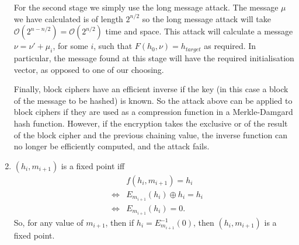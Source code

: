 \begin{enumerate}
For the second stage we simply use the long message attack. The message $\mu$
we have calculated is of length $2^{n/2}$ so the long message attack will take
$\mathcal{O}(2^{n-n/2})=\mathcal{O}(2^{n/2})$ time and space. This attack will
calculate a message $\nu=\nu'+\mu_i$, for some $i$, such that $F(h_0,\nu)=h_{target}$
as required. In particular, the message found at this stage will have the required
initialisation vector, as opposed to one of our choosing.

Finally, block ciphers have an efficient inverse if the key (in this case a block
of the message to be hashed) is known. So the attack above can be applied to block ciphers
if they are used as a compression function in a Merkle-Damgard hash function. However, if the encryption
takes the exclusive or of the result of the block cipher and the previous chaining
value, the inverse function can no longer be efficiently computed, and the attack fails.

\item $(h_i,m_{i+1})$ is a fixed point iff 
	\begin{eqnarray*}
		&&f(h_i,m_{i+1})=h_i \\
		&\Leftrightarrow& E_{m_{i+1}}(h_i)\oplus h_i = h_i \\
		&\Leftrightarrow& E_{m_{i+1}}(h_i)=0.
	\end{eqnarray*}
	So, for any value of $m_{i+1}$, then if $h_i=E^{-1}_{m_{i+1}}(0)$, then $(h_i,m_{i+1})$ is a fixed point.
\end{enumerate}
